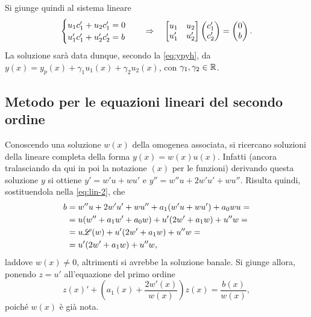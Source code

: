 Si giunge quindi al sistema lineare
\begin{equation}
\begin{cases}
u_1c'_1+u_2c'_1=0\\u'_1c'_1+u'_2c'_2=b
\end{cases}\quad\Rightarrow\quad
\begin{bmatrix}u_1&u_2\\u'_1&u'_2\end{bmatrix}\begin{pmatrix}c'_1\\c'_2\end{pmatrix}=
\begin{pmatrix}0\\b\end{pmatrix}.
\end{equation}
La soluzione sarà data dunque, secondo la \eqref{eq:ypyh}, da $y(x)=y_p(x)+\gamma_1u_1(x)+\gamma_2u_2(x)$, con $\gamma_1,\gamma_2\in\mathbb{R}$.

\subsection*{Metodo per le equazioni lineari del secondo ordine}
Conoscendo una soluzione $w(x)$ della omogenea associata, si ricercano soluzioni della lineare completa della forma $y(x)=w(x)u(x)$. Infatti (ancora tralasciando da qui in poi la notazione $(x)$ per le funzioni) derivando questa soluzione $y$ si ottiene $y'=w'u+wu'$ e $y''=w''u+2w'u'+wu''$. Risulta quindi, sostituendola nella \eqref{eq:lin-2}, che
\[\begin{split}
b	&=w''u+2w'u'+wu''+a_1(w'u+wu')+a_0wu=\\
	&=u(w''+a_1w'+a_0w)+u'(2w'+a_1w)+u''w=\\
	&=u\mathscr L(w)+u'(2w'+a_1w)+u''w=\\
	&=u'(2w'+a_1w)+u''w,
\end{split}\]
laddove $w(x)\neq 0$, altrimenti si avrebbe la soluzione banale. Si giunge allora, ponendo $z=u'$ all'equazione del primo ordine
\begin{equation}
z(x)'+\left(\!a_1(x)+\frac{2w'(x)}{w(x)}\!\right)z(x)=\frac{b(x)}{w(x)},
\end{equation}
poiché $w(x)$ è già nota.

